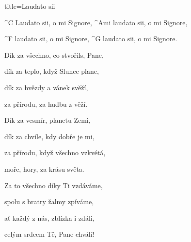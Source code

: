 \begin{song}{title=\predtitle\centering Laudato sii \\\large \phantom{\,} \vspace*{-0.3cm}}  %
\begin{centerjustified}
\nejnejvetsi

	^{C \z}Laudato sii, o mi Signore, ^{Ami \z}laudato sii, o mi Signore,
	
	^{F \z}laudato sii, o mi Signore, ^{G \z}laudato sii, o mi Signore.

\sloka
	Dík za všechno, co stvořils, Pane,

	dík za teplo, když Slunce plane,

	dík za hvězdy a vánek svěží,

	za přírodu, za hudbu z věží.


\sloka
	Dík za vesmír, planetu Zemi,
	
	dík za chvíle, kdy dobře je mi,

	za přírodu, když všechno vzkvétá,

	moře, hory, za krásu světa.


\sloka
	Za to všechno díky Ti vzdáváme,

	spolu s bratry žalmy zpíváme,

	ať každý z nás, zblízka i zdáli,

	celým srdcem Tě, Pane chválí!



\end{centerjustified}
\setcounter{Slokočet}{0}
\end{song}
